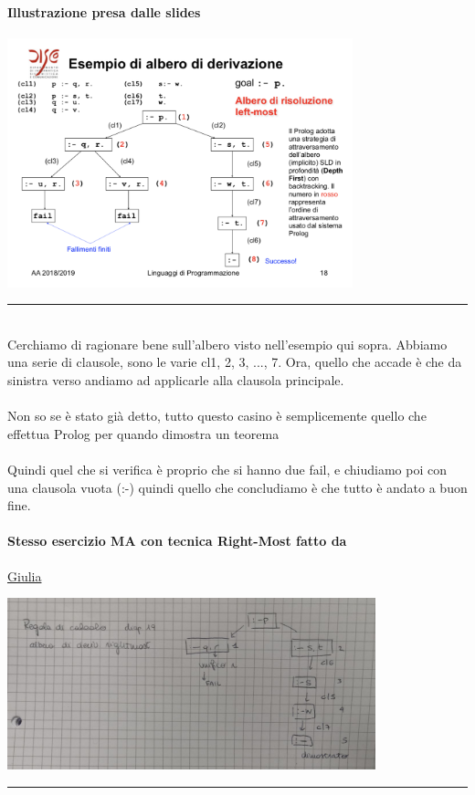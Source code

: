 \documentclass[12pt, a4paper, openany, oneside]{book}
\begin{document}
\paragraph{Illustrazione presa dalle slides}
\begin{center}
\includegraphics[width=0.75\textwidth]{alberoSLD}
\end{center}
{\color{black} \rule{\linewidth}{0.3mm} }
\\
Cerchiamo di ragionare bene sull'albero visto nell'esempio qui sopra. Abbiamo
una serie di clausole, sono le varie cl1, 2, 3, ..., 7. Ora, quello che accade
è che da sinistra verso andiamo ad applicarle alla clausola principale.
\\ \\
Non so se è stato già detto, tutto questo casino è semplicemente quello che 
effettua Prolog per quando dimostra un teorema \\ \\
Quindi quel che si verifica è proprio che si hanno due fail, e chiudiamo 
poi con una clausola vuota (:-) quindi quello che concludiamo è che tutto è 
andato a buon fine.
\paragraph{Stesso esercizio MA con tecnica Right-Most fatto da} 
\href{https://github.com/LiaBell47}{Giulia}
\begin{center}
\includegraphics[width=0.80\textwidth]{rightmost}
\end{center}
{\color{black} \rule{\linewidth}{0.3mm}}
\\
\end{document}
